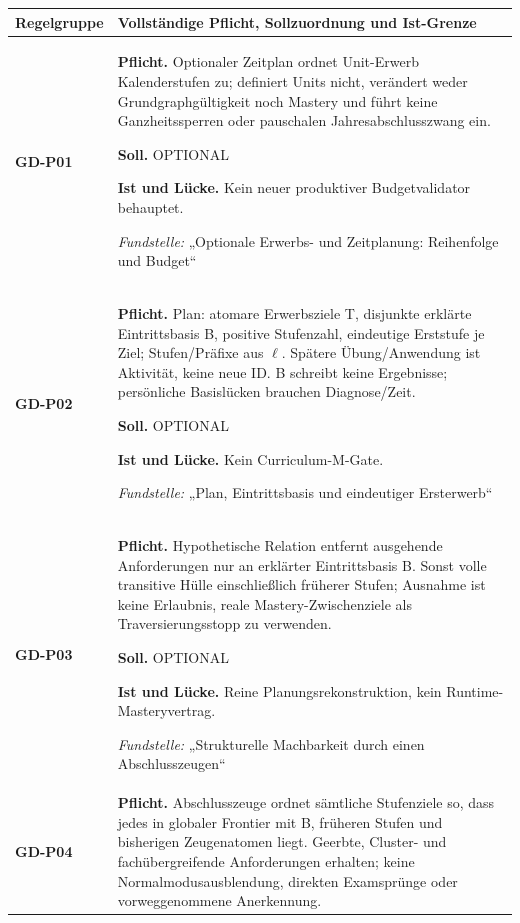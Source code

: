 \begingroup\small
\begin{longtable}{@{}P{20mm}P{128mm}@{}}
\toprule
Regelgruppe & Vollständige Pflicht, Sollzuordnung und Ist-Grenze\\
\midrule\endhead
{}\label{rule:GD-P01}\textbf{GD-P01} &
\textbf{Pflicht.} Optionaler Zeitplan ordnet Unit-Erwerb Kalenderstufen zu; definiert Units nicht, verändert weder Grundgraphgültigkeit noch Mastery und führt keine Ganzheitssperren oder pauschalen Jahresabschlusszwang ein.\par\smallskip
\textbf{Soll.} OPTIONAL\par\smallskip
\textbf{Ist und Lücke.} Kein neuer produktiver Budgetvalidator behauptet.\par\smallskip
\emph{Fundstelle:} „Optionale Erwerbs- und Zeitplanung: Reihenfolge und Budget“\\\addlinespace[5pt]
\label{rule:GD-P02}\textbf{GD-P02} &
\textbf{Pflicht.} Plan: atomare Erwerbsziele T, disjunkte erklärte Eintrittsbasis B, positive Stufenzahl, eindeutige Erststufe je Ziel; Stufen/Präfixe aus \ensuremath{\ell}. Spätere Übung/Anwendung ist Aktivität, keine neue ID. B schreibt keine Ergebnisse; persönliche Basislücken brauchen Diagnose/Zeit.\par\smallskip
\textbf{Soll.} OPTIONAL\par\smallskip
\textbf{Ist und Lücke.} Kein Curriculum-M-Gate.\par\smallskip
\emph{Fundstelle:} „Plan, Eintrittsbasis und eindeutiger Ersterwerb“\\\addlinespace[5pt]
\label{rule:GD-P03}\textbf{GD-P03} &
\textbf{Pflicht.} Hypothetische Relation entfernt ausgehende Anforderungen nur an erklärter Eintrittsbasis B. Sonst volle transitive Hülle einschließlich früherer Stufen; Ausnahme ist keine Erlaubnis, reale Mastery-Zwischenziele als Traversierungsstopp zu verwenden.\par\smallskip
\textbf{Soll.} OPTIONAL\par\smallskip
\textbf{Ist und Lücke.} Reine Planungsrekonstruktion, kein Runtime-Masteryvertrag.\par\smallskip
\emph{Fundstelle:} „Strukturelle Machbarkeit durch einen Abschlusszeugen“\\\addlinespace[5pt]
\label{rule:GD-P04}\textbf{GD-P04} &
\textbf{Pflicht.} Abschlusszeuge ordnet sämtliche Stufenziele so, dass jedes in globaler Frontier mit B, früheren Stufen und bisherigen Zeugenatomen liegt. Geerbte, Cluster- und fachübergreifende Anforderungen erhalten; keine Normalmodusausblendung, direkten Examsprünge oder vorweggenommene Anerkennung.\par\smallskip

\end{longtable}
